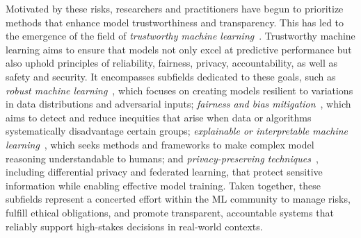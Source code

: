 Motivated by these risks, researchers and practitioners have begun to prioritize methods that enhance model trustworthiness and transparency. This has led to the emergence of the field of \textit{trustworthy machine learning}~\citep{li2023trustworthy}. Trustworthy machine learning aims to ensure that models not only excel at predictive performance but also uphold principles of reliability, fairness, privacy, accountability, as well as safety and security. It encompasses subfields dedicated to these goals, such as \textit{robust machine learning}~\citep{szegedy2013intriguing, papernot2017practical, rahimian2022frameworks}, which focuses on creating models resilient to variations in data distributions and adversarial inputs; \textit{fairness and bias mitigation}~\citep{hardt2016equality, mehrabi2021survey}, which aims to detect and reduce inequities that arise when data or algorithms systematically disadvantage certain groups; \textit{explainable or interpretable machine learning}~\citep{chen2019looks, rudin2019stop}, which seeks methods and frameworks to make complex model reasoning understandable to humans; and \textit{privacy-preserving techniques}~\citep{dwork2014algorithmic, abadi2016deep}, including differential privacy and federated learning, that protect sensitive information while enabling effective model training. Taken together, these subfields represent a concerted effort within the ML community to manage risks, fulfill ethical obligations, and promote transparent, accountable systems that reliably support high-stakes decisions in real-world contexts.

